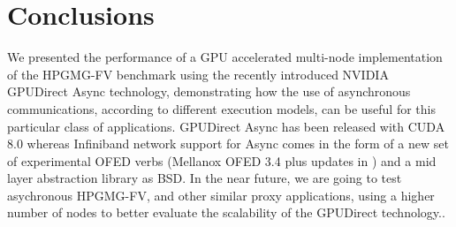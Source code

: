 \documentclass[review]{siamart1116}
\begin{document}


\section{Conclusions}

We presented the performance of a GPU accelerated multi-node
implementation of the HPGMG-FV benchmark using the recently introduced
NVIDIA GPUDirect Async technology, demonstrating how the use of asynchronous communications,
according to different execution models, can be useful for this particular class of applications.
%
GPUDirect Async has been
released with CUDA 8.0 whereas Infiniband network support for
Async comes in the form of a new set of experimental
OFED verbs (Mellanox OFED 3.4 plus updates in \cite{libmlx5_async})
and a mid layer abstraction library \cite{libgdsync} as BSD.
%
In the near future,  we are going to test
asychronous HPGMG-FV, and other similar proxy applications, using a higher number of nodes to
better evaluate the scalability of the GPUDirect technology..
\end{document}
